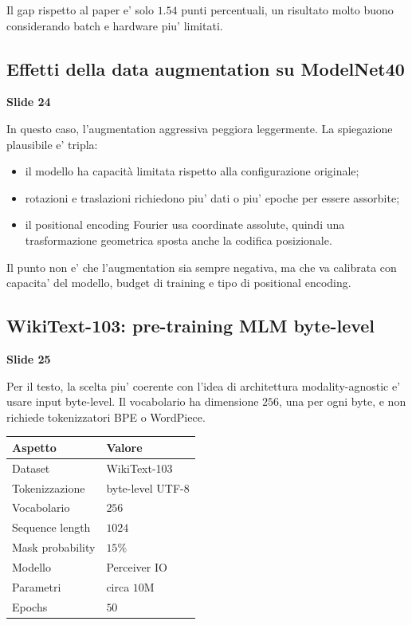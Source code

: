\documentclass[11pt,a4paper]{article}
\newcommand{\slide}[1]{\textcolor{mainblue}{\textbf{Slide #1}}}
\begin{document}
Il gap rispetto al paper e' solo $1.54$ punti percentuali, un risultato molto
buono considerando batch e hardware piu' limitati.

\subsection{Effetti della data augmentation su ModelNet40}
\slide{24}

In questo caso, l'augmentation aggressiva peggiora leggermente. La spiegazione
plausibile e' tripla:
\begin{itemize}
  \item il modello ha capacit\`a limitata rispetto alla configurazione originale;
  \item rotazioni e traslazioni richiedono piu' dati o piu' epoche per essere
  assorbite;
  \item il positional encoding Fourier usa coordinate assolute, quindi una
  trasformazione geometrica sposta anche la codifica posizionale.
\end{itemize}

Il punto non e' che l'augmentation sia sempre negativa, ma che va calibrata con
capacita' del modello, budget di training e tipo di positional encoding.

\subsection{WikiText-103: pre-training MLM byte-level}
\slide{25}

Per il testo, la scelta piu' coerente con l'idea di architettura
modality-agnostic e' usare input byte-level. Il vocabolario ha dimensione
$256$, una per ogni byte, e non richiede tokenizzatori BPE o WordPiece.

\begin{center}
\begin{tabular}{ll}
\toprule
\textbf{Aspetto} & \textbf{Valore} \\
\midrule
Dataset & WikiText-103 \\
Tokenizzazione & byte-level UTF-8 \\
Vocabolario & $256$ \\
Sequence length & $1024$ \\
Mask probability & $15\%$ \\
Modello & Perceiver IO \\
Parametri & circa $10$M \\
Epochs & $50$ \\
\bottomrule
\end{tabular}
\end{center}
\end{document}
